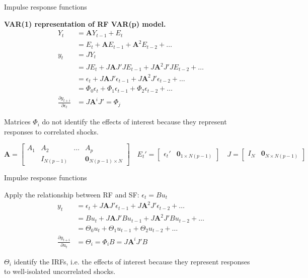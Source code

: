 \documentclass[notes,blackandwhite,mathsans,usenames,dvipsnames]{beamer}
\begin{document}
\begin{frame}{Impulse response functions}

\bigskip\textbf{VAR(1) representation of RF VAR(p) model.}
\begin{align*}
Y_t &= \mathbf{A}Y_{t-1} + E_t\\
&= E_t + \mathbf{A}E_{t-1} + \mathbf{A}^2E_{t-2} + \dots\\[2ex]
y_t &= JY_t\\
&= JE_t + J\mathbf{A}J'JE_{t-1} + J\mathbf{A}^2J'JE_{t-2} + \dots\\
&= \epsilon_t + J\mathbf{A}J'\epsilon_{t-1} + J\mathbf{A}^2J'\epsilon_{t-2} + \dots\\
&= \Phi_0\epsilon_t + \Phi_1\epsilon_{t-1} + \Phi_2\epsilon_{t-2} + \dots\\[2ex]
\frac{\partial y_{t+i}}{\partial \epsilon_t} &= J\mathbf{A}^iJ' = \Phi_j
\end{align*}

{\color{mcxs2}Matrices} $\Phi_i$ {\color{purple}do not identify the effects of interest} {\color{mcxs2}because they represent responses to correlated shocks.}

\bigskip\tiny$$
\mathbf{A} = \begin{bmatrix}A_1 & A_2 &\dots& A_p\\ &I_{N(p-1)}&&\mathbf{0}_{N(p-1)\times N} \end{bmatrix}\quad
E_t' = \begin{bmatrix}\epsilon_t' & \mathbf{0}_{1\times N(p-1)} \end{bmatrix}\quad
J = \begin{bmatrix} I_{N} & \mathbf{0}_{N\times N(p-1)} \end{bmatrix}
$$

\end{frame}



\begin{frame}{Impulse response functions}

{\color{mcxs2}Apply the relationship between RF and SF:} $\epsilon_t=Bu_t$ 
\begin{align*}
y_t &= \epsilon_t + J\mathbf{A}J'\epsilon_{t-1} + J\mathbf{A}^2J'\epsilon_{t-2} + \dots\\
&= Bu_t + J\mathbf{A}J'Bu_{t-1} + J\mathbf{A}^2J'Bu_{t-2} + \dots\\
&= \Theta_0u_t + \Theta_1u_{t-1} + \Theta_2u_{t-2} + \dots\\[2ex]
\frac{\partial y_{t+i}}{\partial u_t} &= \Theta_i = \Phi_iB =  J\mathbf{A}^iJ'B
\end{align*}

 $\Theta_i$ {\color{mcxs2}identify the IRFs, i.e. the effects of interest because they represent responses to well-isolated} {\color{purple}uncorrelated shocks.}

\end{frame}
\end{document}
